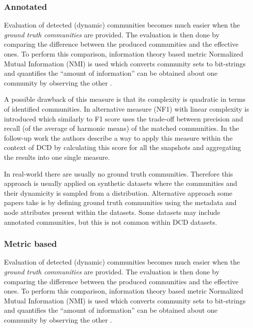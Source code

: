 \documentclass[
acmsmall,
nonacm,
screen,
acmthm]{../../scripts/pandoc/templates/acmart}
\begin{document}
\hypertarget{annotated}{%
\subsubsection{Annotated}\label{annotated}}

Evaluation of detected (dynamic) communities becomes much easier when
the \emph{ground truth communities} are provided. The evaluation is then
done by comparing the difference between the produced communities and
the effective ones. To perform this comparison, information theory based
metric Normalized Mutual Information (NMI) is used which converts
community sets to bit-strings and quantifies the ``amount of
information'' can be obtained about one community by observing the other
\citep{lancichinettiDetectingOverlappingHierarchical2009}.

A possible drawback of this measure is that its complexity is quadratic
in terms of identified communities. In
\citep{rossettiNovelApproachEvaluate2016} alternative measure (NF1) with
linear complexity is introduced which similarly to F1 score uses the
trade-off between precision and recall (of the average of harmonic
means) of the matched communities. In the follow-up work
\citep{rossettiANGELEfficientEffective2020} the authors describe a way
to apply this measure within the context of DCD by calculating this
score for all the snapshots and aggregating the results into one single
measure.

In real-world there are usually no ground truth communities. Therefore
this approach is usually applied on synthetic datasets where the
communities and their dynamicity is sampled from a distribution.
Alternative approach some papers take is by defining ground truth
communities using the metadata and node attributes present within the
datasets. Some datasets may include annotated communities, but this is
not common within DCD datasets.

\hypertarget{metric-based}{%
\subsubsection{Metric based}\label{metric-based}}

Evaluation of detected (dynamic) communities becomes much easier when
the \emph{ground truth communities} are provided. The evaluation is then
done by comparing the difference between the produced communities and
the effective ones. To perform this comparison, information theory based
metric Normalized Mutual Information (NMI) is used which converts
community sets to bit-strings and quantifies the ``amount of
information'' can be obtained about one community by observing the other
\citep{lancichinettiDetectingOverlappingHierarchical2009}.
\end{document}
